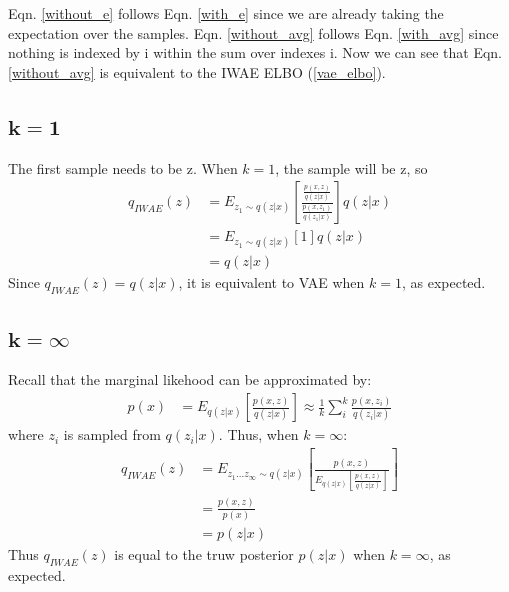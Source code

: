 \documentclass{article}
\begin{document}
Eqn. \ref{without_e} follows Eqn. \ref{with_e} since we are already taking the expectation over the samples. Eqn. \ref{without_avg} follows Eqn. \ref{with_avg} since nothing is indexed by i within the sum over indexes i. Now we can see that Eqn. \ref{without_avg} is equivalent to the IWAE ELBO (\ref{vae_elbo}).





\subsection{\texorpdfstring{$\boldsymbol{k=1}$}{k=1}} %
The first sample needs to be z. When $k=1$, the sample will be z, so
\begin{align} 
    q_{IWAE}(z) &= E_{z_{1} \sim q(z|x)} \left[\frac{\frac{p(x,z)}{q(z|x)}}{ \frac{p(x,z_1)}{q(z_1|x)}}  \right] q(z|x) \\
    &= E_{z_{1} \sim q(z|x)} \left[1  \right] q(z|x) \\
    &= q(z|x)
\end{align}
Since $q_{IWAE}(z)=q(z|x)$, it is equivalent to VAE when $k=1$, as expected.










\subsection{\texorpdfstring{$\boldsymbol{k=\infty}$}{k=inf}} %

Recall that the marginal likehood can be approximated by:
\begin{align} 
    p(x) &= E_{q(z|x)}\left[\frac{p(x,z)}{q(z|x)} \right] \approx \frac{1}{k}\sum_i^k \frac{p(x,z_i)}{q(z_i|x)}
\end{align}
where $z_i$ is sampled from $q(z_i|x)$. Thus, when $k=\infty$:
\begin{align} 
    q_{IWAE}(z) &= E_{z_{1}...z_{\infty} \sim q(z|x)} \left[\frac{p(x,z)}{E_{q(z|x)}\left[\frac{p(x,z)}{q(z|x)} \right]}  \right] \\
    &= \frac{p(x,z)}{p(x)} \\
    &= p(z|x)
\end{align}
Thus $q_{IWAE}(z)$ is equal to the truw posterior $p(z|x)$ when $k=\infty$, as expected.
\end{document}
